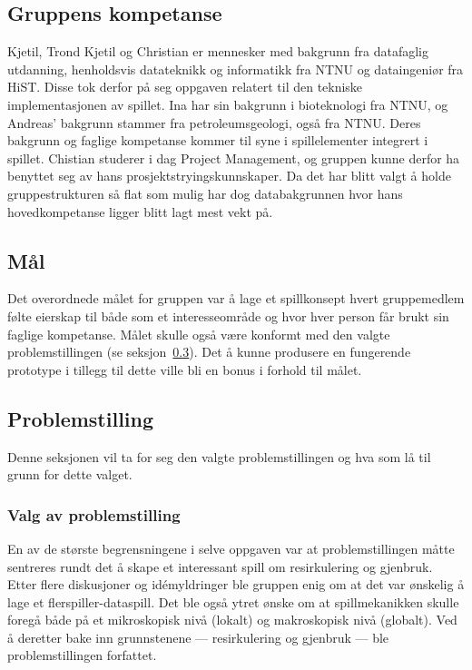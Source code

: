 \subsection{Gruppens kompetanse}

Kjetil, Trond Kjetil og Christian er mennesker med bakgrunn fra datafaglig utdanning, henholdsvis datateknikk og informatikk fra NTNU og dataingeniør fra HiST. Disse tok derfor på seg oppgaven relatert til den tekniske implementasjonen av spillet.
Ina har sin bakgrunn i bioteknologi fra NTNU, og Andreas' bakgrunn stammer fra petroleumsgeologi, også fra NTNU.
Deres bakgrunn og faglige kompetanse kommer til syne i spillelementer integrert i spillet.
Chistian studerer i dag Project Management, og gruppen kunne derfor ha benyttet seg av hans prosjektstryingskunnskaper. Da det har blitt valgt å holde gruppestrukturen så flat som mulig har dog databakgrunnen hvor hans hovedkompetanse ligger blitt lagt mest vekt på.

\subsection{Mål}
Det overordnede målet for gruppen var å lage et spillkonsept hvert
gruppemedlem følte eierskap til både som et interesseområde og hvor hver person får brukt sin faglige kompetanse. Målet skulle også være konformt med den valgte
problemstillingen (se seksjon~\ref{sec:problemstilling}). Det å kunne produsere en fungerende prototype i tillegg til dette ville bli en bonus i forhold til målet.

\subsection{Problemstilling}
\label{sec:problemstilling}
Denne seksjonen vil ta for seg den valgte problemstillingen og hva som
lå til grunn for dette valget.
\subsubsection{Valg av problemstilling}
En av de største begrensningene i selve oppgaven var at
problemstillingen måtte sentreres rundt det å skape et interessant spill
om resirkulering og gjenbruk. Etter flere diskusjoner og idémyldringer ble gruppen
enig om at det var ønskelig å lage et flerspiller-dataspill.
Det ble også ytret ønske om at spillmekanikken skulle foregå både på et
mikroskopisk nivå (lokalt) og makroskopisk nivå (globalt). Ved å
deretter bake inn grunnstenene — resirkulering og
gjenbruk — ble problemstillingen forfattet.
